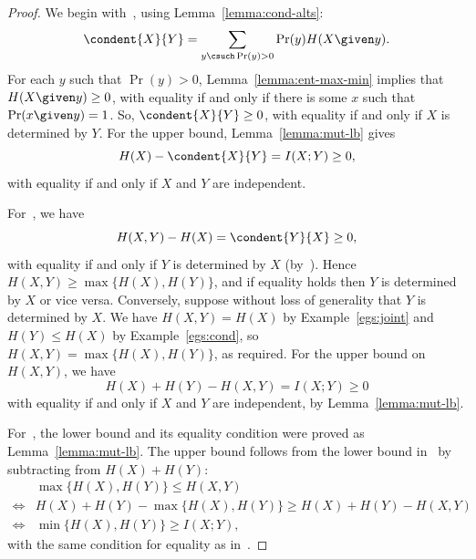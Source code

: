 \begin{proof}
We begin with~, using
Lemma~\ref{lemma:cond-alts}: 
\[
\condent{X}{Y} 
=
\sum_{y \csuch \Pr(y) > 0} \Pr(y) H(X \given y).
\]
For each $y$ such that $\Pr(y) > 0$,
Lemma~\ref{lemma:ent-max-min} implies that $H(X \given
y) \geq 0$, with equality if and only if there is some $x$ such that $\Pr(x
\given y) = 1$.  So, $\condent{X}{Y} \geq 0$, with equality if and only if
$X$ is determined by $Y$.  For the upper bound, Lemma~\ref{lemma:mut-lb}
gives 
\[
H(X) - \condent{X}{Y} = I(X; Y) \geq 0,
\]
with equality if and only if $X$ and $Y$ are independent.

For~, we have
\[
H(X, Y) - H(X) = \condent{Y}{X} \geq 0,
\]
with equality if and only if $Y$ is determined by $X$
(by~).  Hence $H(X, Y) \geq \max\{H(X), H(Y)\}$, and
if equality holds then $Y$ is determined by $X$ or vice versa.  Conversely,
suppose without loss of generality that $Y$ is determined by $X$.  We
have $H(X, Y) = H(X)$ by Example~\ref{egs:joint}
and $H(Y) \leq H(X)$ by Example~\ref{egs:cond}, so
$H(X, Y) = \max\{H(X), H(Y)\}$, as required.  For the upper bound on $H(X,
Y)$, we have
\[
H(X) + H(Y) - H(X, Y) = I(X; Y) \geq 0
\]
with equality if and only if $X$ and $Y$ are independent, by
Lemma~\ref{lemma:mut-lb}. 

For~, the lower bound and its equality condition
were proved as Lemma~\ref{lemma:mut-lb}.  The upper bound follows from the
lower bound in~ by subtracting from $H(X) +
H(Y)$:
% 
\begin{align*}
&
\max\{H(X), H(Y)\} \leq H(X, Y)         \\
\iff
&
H(X) + H(Y) - \max\{H(X), H(Y)\} 
\geq H(X) + H(Y) - H(X, Y)      \\
\iff
&
\min\{H(X), H(Y)\} \geq I(X; Y),
\end{align*}
% 
with the same condition for equality as in~.
\end{proof}

